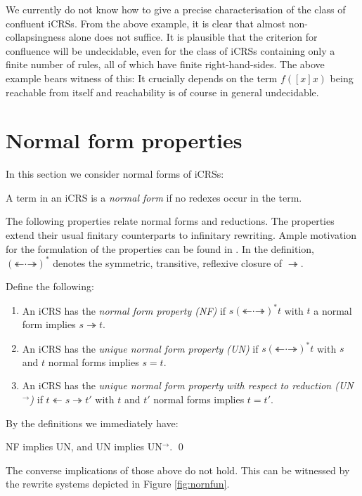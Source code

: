 \documentclass{LMCS}
\theoremstyle{plain}
\theoremstyle{definition}
\newcommand{\rew}{\rightarrow}
\newcommand{\trewt}{\twoheadrightarrow}
\newcommand{\trewtb}{\twoheadleftarrow}
\newcommand{\trewtc}{\mathrel{(\mathord{\trewtb}\mathord{\cdot}\mathord{\trewt})^*}}
\begin{document}
We currently do not know how to give a precise characterisation of the class
of confluent iCRSs. From the above example, it is clear that almost
non-collapsingness alone does not suffice. It is plausible that the criterion
for confluence will be undecidable, even for the class of iCRSs containing
only a finite number of rules, all of which have finite right-hand-sides.
The above example bears witness of this: It crucially depends on the term
$f([x]x)$ being reachable from itself and reachability is of course in
general undecidable.

\section{Normal form properties}
\label{sec:normal_form_properties}

\noindent In this section we consider normal forms of iCRSs:
\begin{defi}
A term in an iCRS is a \emph{normal form} if no redexes occur in the term.
\end{defi}

The following properties relate normal forms and reductions. The properties extend their usual finitary counterparts to infinitary rewriting. Ample motivation for the formulation of the properties can be found in \cite{KKSV95}. In the definition, $\trewtc$ denotes the symmetric, transitive, reflexive closure of $\trewt$.

\begin{defi}
Define the following:
\begin{enumerate}[$\bullet$]
\item
An iCRS has the \emph{normal form property (NF)} if $s \trewtc t$ with $t$ a normal form implies $s \trewt t$.
\item
An iCRS has the \emph{unique normal form property (UN)} if $s \trewtc t$ with $s$ and $t$ normal forms implies $s = t$.
\item
An iCRS has the \emph{unique normal form property with respect to reduction (UN$^\rew$)} if $t \trewtb s \trewt t'$ with $t$ and $t'$ normal forms implies $t = t'$.
\end{enumerate}
\end{defi}

By the definitions we immediately have:
\begin{prop}
\label{prop:nornfun}
NF implies UN, and UN implies UN$^\rew$. \qed
\end{prop}

The converse implications of those above do not hold. This can be witnessed by the rewrite systems depicted in Figure \ref{fig:nornfun}.
\end{document}
